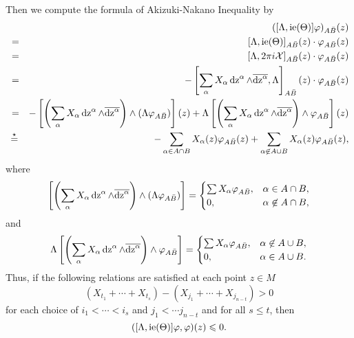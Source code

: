 \documentclass[lang=en,12pt]{beautybook}
\begin{document}
Then we compute the formula of Akizuki-Nakano Inequality by
\begin{eqnarray*}
  &&([\Lambda, \operatorname{ie} (\Theta)] \varphi)_{A \bar{B}} (z) \\
  & = & [\Lambda,
  \operatorname{ie} (\Theta)]_{A \bar{B}} (z) \cdot \varphi_{A \bar{B}} (z)\\
  & = & [\Lambda, 2 \pi i\mathcal{X}]_{A \bar{B}} (z) \cdot \varphi_{A
  \bar{B}} (z)\\
  & = & - \left[ \sum_{\alpha} X_{\alpha} \operatorname{dz}^{\alpha} \wedge
  \overline{\operatorname{dz}^{\alpha}}, \Lambda \right]_{A \bar{B}} (z) \cdot
  \varphi_{A \bar{B}} (z)\\
  & = & - \left[ \left( \sum_{\alpha} X_{\alpha} \operatorname{dz}^{\alpha} \wedge
  \overline{\operatorname{dz}^{\alpha}} \right) \wedge (\Lambda \varphi_{A \bar{B}}) 
  \right] (z) + \Lambda \left[ \left( \sum_{\alpha} X_{\alpha}
  \operatorname{dz}^{\alpha} \wedge \overline{\operatorname{dz}^{\alpha}} \right) \wedge
  \varphi_{A \bar{B}} \right] (z)\\
  & \mathop{=}\limits_{}^{\star} & - \sum_{\alpha \in A \cap B} X_{\alpha} (z)
  \varphi_{A \bar{B}} (z) + \sum_{\alpha \not{\in} A \cup B} X_{\alpha} (z)
  \varphi_{A \bar{B}} (z),
\end{eqnarray*}
where
\begin{align*}
  \left[ \left( \sum_{\alpha} X_{\alpha} \operatorname{dz}^{\alpha} \wedge
  \overline{\operatorname{dz}^{\alpha}} \right) \wedge (\Lambda \varphi_{A \bar{B}}) 
  \right] =
  \begin{cases}
    \sum X_{\alpha} \varphi_{A \bar{B}}, &\alpha \in A \cap B,\\
    0, & \alpha \not\in A \cap B,
  \end{cases}
\end{align*}
and
\begin{align*}
  \Lambda \left[ \left( \sum_{\alpha} X_{\alpha} \operatorname{dz}^{\alpha} \wedge
  \overline{\operatorname{dz}^{\alpha}} \right) \wedge \varphi_{A \bar{B}} \right] 
  =\begin{cases}
    \sum X_{\alpha} \varphi_{A \bar{B}}, &\alpha \not\in A \cup
  B,\\ 
  0, &\alpha \in A \cup B.
  \end{cases}
\end{align*}
Thus, if the following relations are satisfied at each point $z \in M$
\[  (X_{t_1} + \cdots + X_{t_s}) - (X_{j_1} + \cdots + X_{j_{n - t}}) > 0 \]
for each choice of $i_1 < \cdots < i_s$ and $j_1 < \cdots j_{n - t}$ and for
all $s \leqslant t$, then
\begin{equation}
  ( [\Lambda, \operatorname{ie} (\Theta)] \varphi, \varphi) (z) \leqslant 0. \label{2}
\end{equation}
\end{document}
